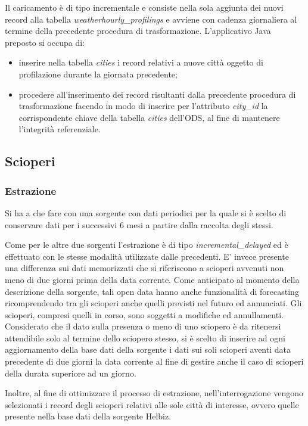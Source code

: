 Il caricamento è di tipo incrementale e consiste nella sola aggiunta dei nuovi
record alla tabella \textit{weather\-hourly\_profilings} e avviene con cadenza
giornaliera al termine della precedente procedura di trasformazione.
L'applicativo Java preposto si occupa di:
\begin{itemize}
\item inserire nella tabella \textit{cities} i record relativi a nuove città oggetto
di profilazione durante la giornata precedente;
\item procedere all'inserimento dei record risultanti dalla precedente procedura di
trasformazione facendo in modo di inserire per l'attributo \textit{city\_id}
la corrispondente chiave della tabella \textit{cities} dell'ODS, al fine
di mantenere l'integrità referenziale.
\end{itemize}

\subsection{Scioperi}

\subsubsection{Estrazione}

Si ha a che fare con una sorgente con dati periodici per la quale si è scelto di 
conservare dati per i successivi 6 mesi a partire dalla raccolta degli stessi.

Come per le altre due sorgenti l'estrazione è di tipo
\textit{incremental\_delayed} ed è effettuato con le stesse modalità utilizzate
dalle precedenti.
E' invece presente una differenza sui dati
memorizzati che si riferiscono a scioperi avvenuti non meno di due giorni prima
della data corrente. Come anticipato al momento della descrizione della sorgente,
tali open data hanno anche funzionalità di forecasting ricomprendendo tra gli scioperi
anche quelli previsti nel futuro ed annunciati. Gli scioperi, compresi quelli in corso,
sono soggetti a modifiche ed annullamenti. Considerato che il dato sulla
presenza o meno di uno sciopero è da ritenersi attendibile solo al termine dello
sciopero stesso, si è scelto di inserire ad ogni aggiornamento della base dati
della sorgente i dati sui soli scioperi aventi data precedente di due giorni la
data corrente al fine di gestire anche il caso di scioperi della durata superiore 
ad un giorno.

Inoltre, al fine di ottimizzare il processo di estrazione, nell'interrogazione
vengono selezionati i record degli scioperi relativi alle sole città di interesse,
ovvero quelle presente nella base dati della sorgente Helbiz.

